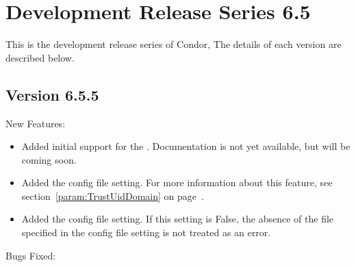 \section{\label{sec:History-6-5}Development Release Series 6.5}

This is the development release series of Condor,
The details of each version are described below.

\subsection{\label{sec:New-6-5-5}Version 6.5.5}

\noindent New Features:

\begin{itemize}

\item Added initial support for the .
  Documentation is not yet available, but will be coming soon.

\item Added the  config file setting.
  For more information about this feature, see
  section~\ref{param:TrustUidDomain} on
  page~\pageref{param:TrustUidDomain}. 

\item Added the  config file setting.
  If this setting is False, the absence of the file specified in the 
   config file setting is not treated as an error.

\end{itemize}

\noindent Bugs Fixed:

